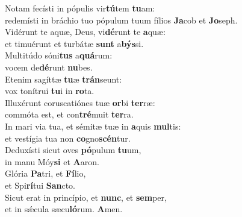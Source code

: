 \evenverse Notam fecísti in pópulis vir\textbf{tú}tem \textbf{tu}am:~\*\\
\evenverse redemísti in bráchio tuo pópulum tuum fílios \textbf{Ja}cob et \textbf{Jo}seph.\\
\oddverse Vidérunt te aquæ, Deus, vi\textbf{dé}runt te \textbf{a}quæ:~\*\\
\oddverse et timuérunt et turbátæ \textbf{sunt} a\textbf{býs}si.\\
\evenverse Multitúdo sóni\textbf{tus} a\textbf{quá}rum:~\*\\
\evenverse vocem de\textbf{dé}runt \textbf{nu}bes.\\
\oddverse Etenim sagíttæ \textbf{tu}æ \textbf{trán}seunt:~\*\\
\oddverse vox tonítrui \textbf{tu}i in \textbf{ro}ta.\\
\evenverse Illuxérunt coruscatiónes tuæ \textbf{or}bi \textbf{ter}ræ:~\*\\
\evenverse commóta est, et con\textbf{tré}muit \textbf{ter}ra.\\
\oddverse In mari via tua, et sémitæ tuæ in \textbf{a}quis \textbf{mul}tis:~\*\\
\oddverse et vestígia tua non \textbf{co}gno\textbf{scén}tur.\\
\evenverse Deduxísti sicut oves \textbf{pó}pulum \textbf{tu}um,~\*\\
\evenverse in manu Móy\textbf{si} et \textbf{A}aron.\\
\oddverse Glória \textbf{Pa}tri, et \textbf{Fí}lio,~\*\\
\oddverse et Spi\textbf{rí}tui \textbf{San}cto.\\
\evenverse Sicut erat in princípio, et \textbf{nunc}, et \textbf{sem}per,~\*\\
\evenverse et in sǽcula sæcu\textbf{ló}rum. \textbf{A}men.\\
